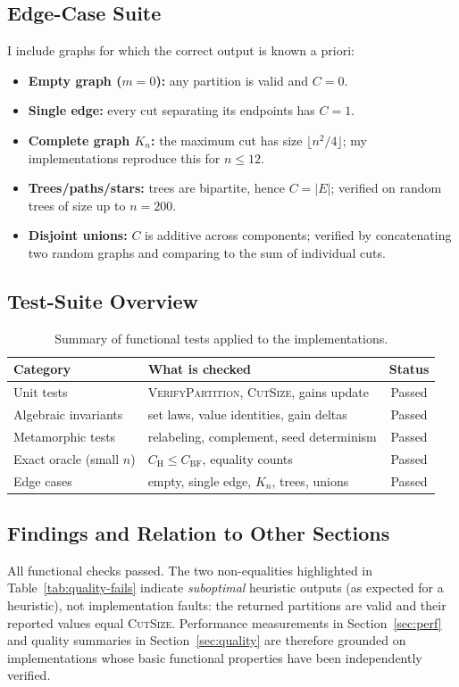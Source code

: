 \documentclass[12pt]{article}
\begin{document}
\subsection{Edge-Case Suite}
I include graphs for which the correct output is known a priori:
\begin{itemize}
    \item \textbf{Empty graph ($m=0$):} any partition is valid and $C=0$.
    \item \textbf{Single edge:} every cut separating its endpoints has $C=1$.
    \item \textbf{Complete graph $K_n$:} the maximum cut has size $\lfloor n^2/4\rfloor$; my implementations reproduce this for $n\le 12$.
    \item \textbf{Trees/paths/stars:} trees are bipartite, hence $C=|E|$; verified on random trees of size up to $n=200$.
    \item \textbf{Disjoint unions:} $C$ is additive across components; verified by concatenating two random graphs and comparing to the sum of individual cuts.
\end{itemize}

\subsection{Test-Suite Overview}
\begin{table}[H]
\centering
\begin{tabular}{@{}llc@{}}
\toprule
Category & What is checked & Status \\ \midrule
Unit tests & \textsc{VerifyPartition}, \textsc{CutSize}, gains update & Passed \\
Algebraic invariants & set laws, value identities, gain deltas & Passed \\
Metamorphic tests & relabeling, complement, seed determinism & Passed \\
Exact oracle (small $n$) & $C_{\mathrm{H}}\le C_{\mathrm{BF}}$, equality counts & Passed \\
Edge cases & empty, single edge, $K_n$, trees, unions & Passed \\ \bottomrule
\end{tabular}
\caption{Summary of functional tests applied to the implementations.}
\label{tab:functional-overview}
\end{table}

\subsection{Findings and Relation to Other Sections}
All functional checks passed. The two non-equalities highlighted in Table~\ref{tab:quality-fails} indicate \emph{suboptimal} heuristic outputs (as expected for a heuristic), not implementation faults: the returned partitions are valid and their reported values equal \textsc{CutSize}. Performance measurements in Section~\ref{sec:perf} and quality summaries in Section~\ref{sec:quality} are therefore grounded on implementations whose basic functional properties have been independently verified.
\end{document}
